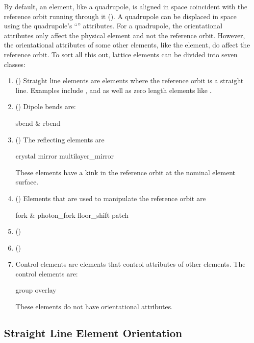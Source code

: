By default, an element, like a quadrupole, is aligned in space
coincident with the reference orbit running through it
(). A quadrupole can be displaced in space using
the quadrupole's ``'' attributes. For a quadrupole,
the orientational attributes only affect the physical element and not
the reference orbit. However, the orientational attributes of some
other elements, like the  element, do affect the
reference orbit. To sort all this out, lattice elements can be divided
into seven classes:
  \begin{enumerate}
  \item{} () \Newline
Straight line elements are elements where the reference orbit is a
straight line. Examples include , and 
as well as zero length elements like .
  \item{} () \Newline
Dipole bends are:
\begin{example}
  sbend \& rbend
\end{example}
  \item{} () \Newline
The reflecting elements are
\begin{example}
  crystal
  mirror
  multilayer_mirror
\end{example}
These elements have a kink in the reference orbit at the nominal
element surface.
  \item{} () \Newline
Elements that are used to manipulate the reference orbit are
\begin{example}
  fork \& photon_fork
  floor_shift
  patch
\end{example}
  \item{} () \Newline
  \item{} () \Newline
  \item{} \Newline
Control elements are elements that control attributes of other
elements. The control elements are:
\begin{example}
  group
  overlay
\end{example}
These elements do not have orientational attributes.
  \end{enumerate}

\subsection{Straight Line Element Orientation}
\label{ss:straight.orient}


